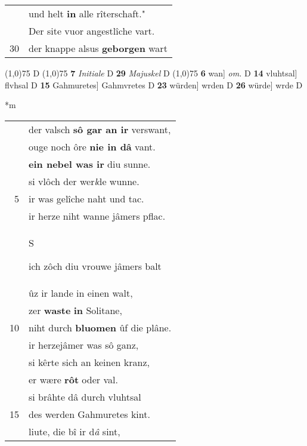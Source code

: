 \documentclass[8pt,a4paper,notitlepage]{article}
\begin{document}
\begin{table}[ht]
\begin{minipage}[t]{0.5\linewidth}
\begin{tabular}{rl}
 & und helt \textbf{in} alle rîterschaft."\\ 
 & Der site vuor angestlîche vart.\\ 
30 & der knappe alsus \textbf{geborgen} wart\\ 
\end{tabular}
\scriptsize
\line(1,0){75} \newline
D \newline
\line(1,0){75} \newline
\textbf{7} \textit{Initiale} D  \textbf{29} \textit{Majuskel} D  \newline
\line(1,0){75} \newline
\textbf{6} wan] \textit{om.} D \textbf{14} vluhtsal] flvhsal D \textbf{15} Gahmuretes] Gahmvretes D \textbf{23} würden] wrden D \textbf{26} würde] wrde D \newline
\end{minipage}
\hspace{0.5cm}
\begin{minipage}[t]{0.5\linewidth}
\small
\begin{center}*m
\end{center}
\begin{tabular}{rl}
 & der valsch \textbf{sô gar an ir} verswant,\\ 
 & ouge noch ôre \textbf{nie in dâ} vant.\\ 
 & \textbf{ein nebel was ir} diu sunne.\\ 
 & si vlôch der wer\textit{l}de wunne.\\ 
5 & ir was gelîche naht und tac.\\ 
 & ir herze niht wanne jâmers pflac.\\ 
 & \begin{large}S\end{large}ich zôch diu vrouwe jâmers balt\\ 
 & ûz ir lande in einen walt,\\ 
 & zer \textbf{waste} \textbf{in} Solitane,\\ 
10 & niht durch \textbf{bluomen} ûf die plâne.\\ 
 & ir herzejâmer was sô ganz,\\ 
 & si kêrte sich an keinen kranz,\\ 
 & er wære \textbf{rôt} oder val.\\ 
 & si brâhte dâ durch vluhtsal\\ 
15 & des werden Gahmuretes kint.\\ 
 & liute, die bî ir d\textit{â} sint,\\ 

\end{tabular}
\end{minipage}
\end{table}
\end{document}
